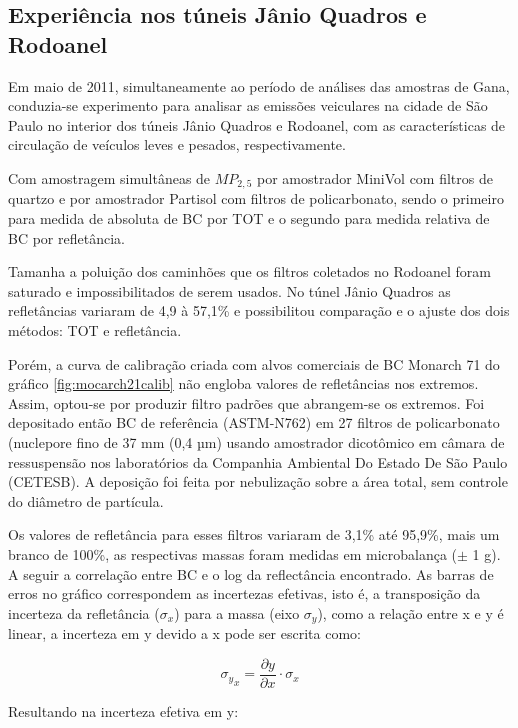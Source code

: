 \subsection{Experiência nos túneis Jânio Quadros e Rodoanel}

Em maio de 2011, simultaneamente ao período de análises das amostras de Gana,
conduzia-se experimento para analisar as emissões veiculares na cidade de São 
Paulo no interior dos túneis Jânio Quadros e Rodoanel, com as características
de circulação de veículos leves e pesados, respectivamente. 

Com amostragem simultâneas de $MP_{2,5}$ por amostrador MiniVol com 
filtros de quartzo e por amostrador Partisol com filtros de policarbonato, 
sendo o primeiro para medida de absoluta de BC por TOT e o segundo para medida
relativa de BC por refletância.

Tamanha a poluição dos caminhões que os filtros coletados no Rodoanel 
foram saturado e impossibilitados de serem usados. No túnel Jânio Quadros
as refletâncias variaram de 4,9 à 57,1\% e possibilitou comparação e o 
ajuste dos dois métodos: TOT e refletância.

Porém, a curva de calibração criada com alvos comerciais de BC Monarch 71
do gráfico \ref{fig:mocarch21calib} não engloba valores de refletâncias 
nos extremos.
Assim, optou-se por produzir filtro padrões que abrangem-se os extremos.   
Foi depositado então BC de referência (ASTM-N762) em 27 filtros de policarbonato
(nuclepore fino de 37 mm (0,4 µm) usando amostrador dicotômico em câmara de 
ressuspensão nos laboratórios da 
Companhia Ambiental Do Estado De São Paulo (CETESB). A deposição foi feita por 
nebulização sobre a área total, sem controle do diâmetro de partícula.

Os valores de refletância para esses filtros variaram de 3,1\% até 95,9\%, 
mais um branco de 100\%, as respectivas massas foram medidas em microbalança 
($\pm$ 1 g). A seguir a correlação entre BC e o log da reflectância encontrado.
As barras de erros no gráfico correspondem as incertezas efetivas, isto é, 
a transposição da incerteza da refletância ($\sigma_x$) para a massa 
(eixo $\sigma_y$), como a relação entre x e y é linear, a incerteza em y 
devido a x pode ser escrita como:

\begin{equation}
  {\sigma_y}_x = \frac{\partial y}{\partial x} \cdot \sigma_x
\end{equation} 

Resultando na incerteza efetiva em y: 

